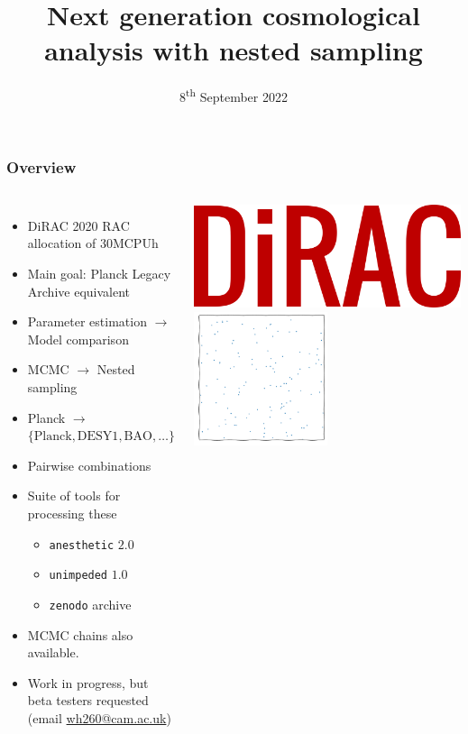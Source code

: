 \documentclass[aspectratio=169]{beamer}
\title{Next generation cosmological analysis with nested sampling}
\date{8\textsuperscript{th} September 2022}
\begin{document}
\begin{frame}
    \titlepage
\end{frame}

\begin{frame}
    \frametitle{Overview}
    \begin{columns}
        \begin{itemize}
            \item DiRAC 2020 RAC allocation of 30MCPUh
            \item Main goal: Planck Legacy Archive equivalent
            \item Parameter estimation $\to$ Model comparison
            \item MCMC $\to$ Nested sampling
            \item Planck $\to$ $\{\text{Planck}, \text{DESY1}, \text{BAO}, \ldots \}$
            \item Pairwise combinations
            \item Suite of tools for processing these 
                \begin{itemize}
                    \item \texttt{anesthetic} $2.0$
                    \item \texttt{unimpeded} $1.0$
                    \item \texttt{zenodo} archive
                \end{itemize}
            \item MCMC chains also available.
            \item Work in progress, but beta testers requested (email \href{mailto:wh260@cam.ac.uk}{wh260@cam.ac.uk})
        \end{itemize}
        \includegraphics[width=\textwidth]{logos/dirac}
        \includegraphics[width=0.5\textwidth,page=21]{figures/himmelblau}%

\end{columns}
\end{frame}
\end{document}
